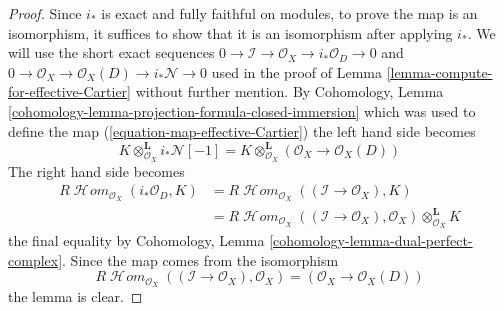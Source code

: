 \documentclass[10pt,a4paper]{amsart}
\theoremstyle{plain}
\theoremstyle{definition}
\theoremstyle{remark}
\numberwithin{equation}{subsection}
\def\SheafHom{\mathop{\mathcal{H}\!\mathit{om}}\nolimits}
\begin{document}
\begin{proof}
Since $i_*$ is exact and fully faithful on modules, to prove the map is an
isomorphism, it suffices to show that it is an isomorphism after applying
$i_*$. We will use the short exact sequences
$0 \to \mathcal{I} \to \mathcal{O}_X \to i_*\mathcal{O}_D \to 0$
and
$0 \to \mathcal{O}_X \to \mathcal{O}_X(D) \to i_*\mathcal{N} \to 0$
used in the proof of Lemma \ref{lemma-compute-for-effective-Cartier}
without further mention. By
Cohomology, Lemma \ref{cohomology-lemma-projection-formula-closed-immersion}
which was used to define the map (\ref{equation-map-effective-Cartier})
the left hand side becomes
$$
K \otimes_{\mathcal{O}_X}^\mathbf{L} i_*\mathcal{N}[-1] =
K \otimes_{\mathcal{O}_X}^\mathbf{L} (\mathcal{O}_X \to \mathcal{O}_X(D))
$$
The right hand side becomes
\begin{align*}
R\SheafHom_{\mathcal{O}_X}(i_*\mathcal{O}_D, K) & =
R\SheafHom_{\mathcal{O}_X}((\mathcal{I} \to \mathcal{O}_X), K) \\
& =
R\SheafHom_{\mathcal{O}_X}((\mathcal{I} \to \mathcal{O}_X), \mathcal{O}_X)
\otimes_{\mathcal{O}_X}^\mathbf{L} K
\end{align*}
the final equality by
Cohomology, Lemma \ref{cohomology-lemma-dual-perfect-complex}.
Since the map comes from the isomorphism
$$
R\SheafHom_{\mathcal{O}_X}((\mathcal{I} \to \mathcal{O}_X), \mathcal{O}_X)
= (\mathcal{O}_X \to \mathcal{O}_X(D))
$$
the lemma is clear.
\end{proof}
\end{document}
